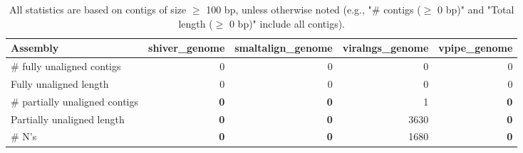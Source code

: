 \documentclass[12pt,a4paper]{article}
\begin{document}
\begin{table}[ht]
\begin{center}
\caption{All statistics are based on contigs of size $\geq$ 100 bp, unless otherwise noted (e.g., "\# contigs ($\geq$ 0 bp)" and "Total length ($\geq$ 0 bp)" include all contigs).}
\begin{tabular}{|l*{4}{|r}|}
\hline
Assembly & shiver\_genome & smaltalign\_genome & viralngs\_genome & vpipe\_genome \\ \hline
\# fully unaligned contigs & 0 & 0 & 0 & 0 \\ \hline
Fully unaligned length & 0 & 0 & 0 & 0 \\ \hline
\# partially unaligned contigs & {\bf 0} & {\bf 0} & 1 & {\bf 0} \\ \hline
Partially unaligned length & {\bf 0} & {\bf 0} & 3630 & {\bf 0} \\ \hline
\# N's & {\bf 0} & {\bf 0} & 1680 & {\bf 0} \\ \hline
\end{tabular}
\end{center}
\end{table}
\end{document}
